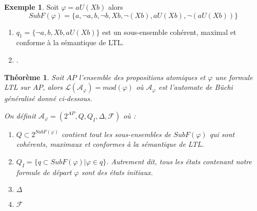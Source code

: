 \documentclass[12pt,a4paper]{article}
\theoremstyle{plain}
\newtheorem{thm}{Théorème}
\theoremstyle{definition}
\newtheorem{ex}{Exemple}
\begin{document}
\begin{ex}
  Soit $\varphi = a U (Xb)$ alors
  \[
    SubF(\varphi) = \{a, \lnot a, b, \lnot b, Xb, \lnot (Xb), a U (Xb), \lnot (aU(Xb))\}
  \]
  \begin{enumerate}
  \item $q_1 = \{\lnot a, b, Xb, a U (Xb)\}$ est un sous-ensemble cohérent, maximal et conforme à la sémantique de LTL.
  \item $ $.
  \end{enumerate}
\end{ex}

\begin{thm}
  Soit $AP$ l'ensemble des propositions atomiques et $\varphi$ une formule LTL sur $AP$, alors $\mathcal{L}(\mathcal{A}_\varphi) = mod(\varphi)$
  où $\mathcal{A}_\varphi$ est l'automate de Büchi généralisé donné ci-dessous.

  \noindent
  On définit $\mathcal{A}_\varphi = (2^{AP}, Q, Q_I, \Delta, \mathcal{F})$ où :
  \begin{enumerate}
  \item $Q \subset 2^{SubF(\varphi)}$ contient tout les sous-ensembles de $SubF(\varphi)$ qui sont cohérents, maximaux et conformes à la sémantique de LTL.
  \item $Q_I = \{ q \subset SubF(\varphi) | \varphi \in q \}$. Autrement dit, tous les états contenant notre formule de départ $\varphi$ sont des états initiaux.
  \item $\Delta$
  \item $\mathcal{F}$
  \end{enumerate}
\end{thm}
\end{document}
